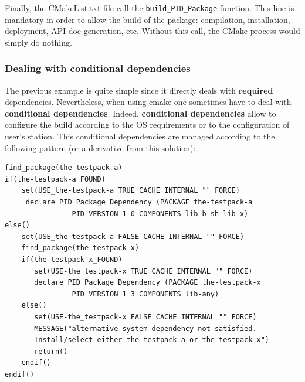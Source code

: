 \documentclass[12pt,a4paper]{article}
\begin{document}
Finally, the CMakeList.txt file call the \texttt{build\_PID\_Package} function. This line is mandatory in order to allow the build of the package: compilation, installation, deployment, API doc generation, etc. Without this call, the CMake process would simply do nothing.

\subsubsection{Dealing with conditional dependencies}
\label{sec:rootCMakeComplexDeps}

The previous example is quite simple since it directly deals with \textbf{required} dependencies. Nevertheless, when using cmake one sometimes have to deal with \textbf{conditional dependencies}. Indeed, \textbf{conditional dependencies} allow to configure the build according to the OS requirements or to the configuration of user's station. This conditional dependencies are managed according to the following pattern (or a derivative from this solution):
\begin{verbatim}
find_package(the-testpack-a)
if(the-testpack-a_FOUND)
    set(USE_the-testpack-a TRUE CACHE INTERNAL "" FORCE)
     declare_PID_Package_Dependency (PACKAGE the-testpack-a
                PID VERSION 1 0 COMPONENTS lib-b-sh lib-x)
else()
    set(USE_the-testpack-a FALSE CACHE INTERNAL "" FORCE)
    find_package(the-testpack-x)
    if(the-testpack-x_FOUND)
       set(USE-the_testpack-x TRUE CACHE INTERNAL "" FORCE)
       declare_PID_Package_Dependency (PACKAGE the-testpack-x
                PID VERSION 1 3 COMPONENTS lib-any)
    else()
       set(USE-the_testpack-x FALSE CACHE INTERNAL "" FORCE)
       MESSAGE("alternative system dependency not satisfied. 
       Install/select either the-testpack-a or the-testpack-x")
       return()       
    endif()
endif()
\end{verbatim}
\end{document}
